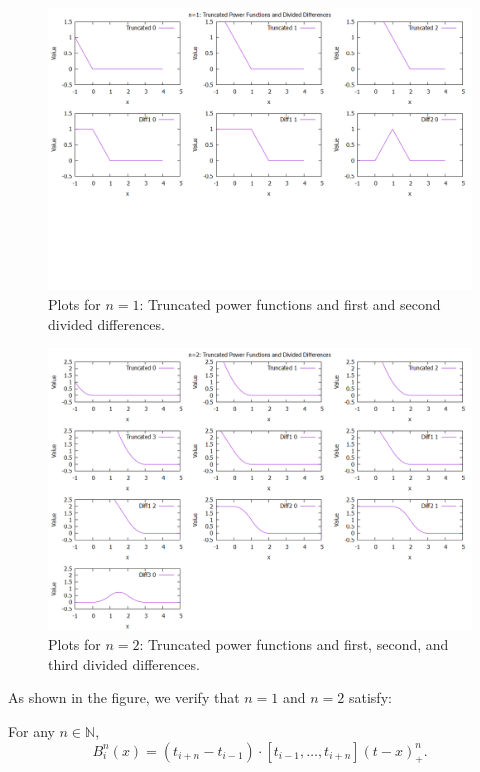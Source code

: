 \documentclass{article}
\begin{document}
\begin{figure}[H]
    \centering
    \includegraphics[width=\textwidth]{../figure/basis_functions_n1.png}
    \caption{Plots for \( n=1 \): Truncated power functions and first and second divided differences.}
    \label{fig:n1_plots}
\end{figure}

\begin{figure}[H]
    \centering
    \includegraphics[width=\textwidth]{../figure/basis_functions_n2.png}
    \caption{Plots for \( n=2 \): Truncated power functions and first, second, and third divided differences.}
    \label{fig:n2_plots}
\end{figure}

As shown in the figure, we verify that \(n=1\) and \(n=2\) satisfy:\par
For any \( n \in \mathbb{N} \),
\[ B_i^n(x) = (t_{i+n} - t_{i-1}) \cdot [t_{i-1}, \ldots, t_{i+n}] (t - x)_+^n. \]
\end{document}
